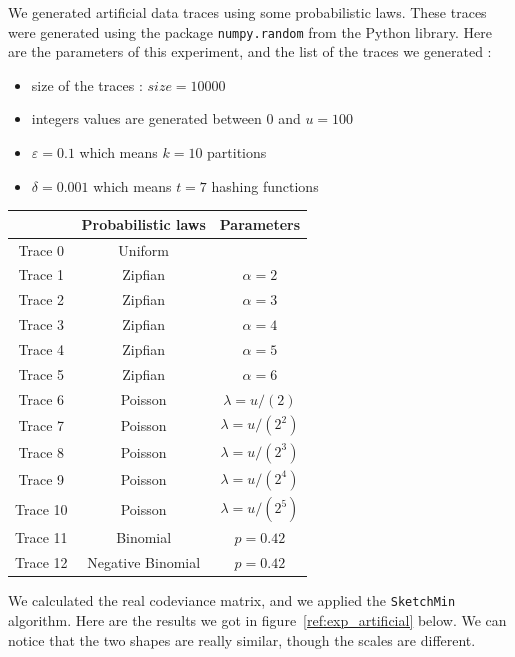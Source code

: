 \documentclass[a4paper]{article}%
\begin{document}
We generated artificial data traces using some probabilistic laws. These traces were generated using the package \texttt{numpy.random} from the Python library. Here are the parameters of this experiment, and the list of the traces we generated :
\begin{itemize}
	\item size of the traces : $size = 10 000$
	\item integers values are generated between $0$ and $u = 100$
	\item $\varepsilon = 0.1$ which means $k = 10$ partitions
	\item $\delta = 0.001$ which means $t = 7$ hashing functions
\end{itemize}

\begin{center}
	\begin{tabular}{|c|c|c|}
		\hline
		 & Probabilistic laws & Parameters \\
		 \hline
		Trace 0 & Uniform & \\
		Trace 1 & Zipfian & $\alpha = 2$ \\
		Trace 2 & Zipfian & $\alpha = 3$ \\
		Trace 3 & Zipfian & $\alpha = 4$ \\
		Trace 4 & Zipfian & $\alpha = 5$ \\ 
		Trace 5 & Zipfian & $\alpha = 6$ \\
		Trace 6 & Poisson & $\lambda = u/(2)$ \\
		Trace 7 & Poisson & $\lambda = u/(2^2)$ \\
		Trace 8 & Poisson & $\lambda = u/(2^3)$ \\
		Trace 9 & Poisson & $\lambda = u/(2^4)$ \\
		Trace 10 & Poisson & $\lambda = u/(2^5)$ \\
		Trace 11 & Binomial & $p = 0.42$ \\
		Trace 12 & Negative Binomial & $p = 0.42$ \\
		\hline
	\end{tabular}
\end{center}


We calculated the real codeviance matrix, and we applied the \texttt{SketchMin} algorithm. Here are the results we got in figure~\ref{ref:exp_artificial} below. We can notice that the two shapes are really similar, though the scales are different.
\end{document}
